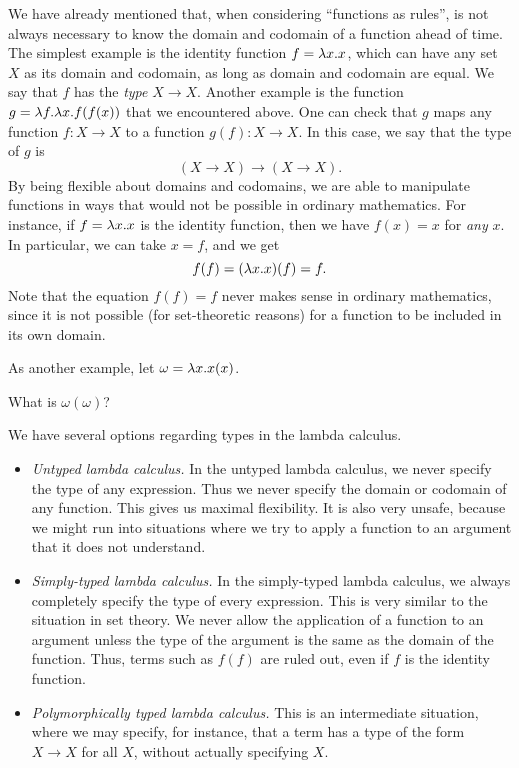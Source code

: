 \documentclass{article}
\begin{document}
We have already mentioned that, when considering ``functions as
rules'', is not always necessary to know the domain and codomain of a
function ahead of time. The simplest example is the identity function
$f = \lambda x.x$, which can have any set $X$ as its domain and codomain,
as long as domain and codomain are equal. We say that $f$ has the {\em
  type} $X\to X$.  Another example is the function $g = \lambda f.\lambda
x.f(f(x))$ that we encountered above. One can check that $g$ maps any
function $f:X\to X$ to a function $g(f):X\to X$. In this case, we say
that the type of $g$ is
\[          (X\to X)\to(X\to X).
\]
By being flexible about domains and codomains, we are able to
manipulate functions in ways that would not be possible in ordinary
mathematics. For instance, if $f=\lambda x.x$ is the identity function,
then we have $f(x) = x$ for {\em any} $x$. In particular, we can take
$x=f$, and we get
\[     f(f) = (\lambda x.x)(f) = f.
\]
Note that the equation $f(f)=f$ never makes sense in ordinary
mathematics, since it is not possible (for set-theoretic reasons) for
a function to be included in its own domain.

As another example, let $\omega = \lambda x.x(x)$. 

\begin{exercise}
  What is $\omega(\omega)$?
\end{exercise}

We have several options regarding types in the lambda calculus.
\begin{itemize}
\item {\em Untyped lambda calculus.} In the untyped lambda calculus,
  we never specify the type of any expression. Thus we never specify
  the domain or codomain of any function. This gives us maximal
  flexibility. It is also very unsafe, because we might run into
  situations where we try to apply a function to an argument that it
  does not understand. 
\item {\em Simply-typed lambda calculus.} In the simply-typed lambda
  calculus, we always completely specify the type of every expression. 
  This is very similar to the situation in set theory. We never allow
  the application of a function to an argument unless the type of the
  argument is the same as the domain of the function. Thus, terms such
  as $f(f)$ are ruled out, even if $f$ is the identity function.
\item {\em Polymorphically typed lambda calculus.} This is an
  intermediate situation, where we may specify, for instance, that a
  term has a type of the form $X\to X$ for all $X$, without actually
  specifying $X$.
\end{itemize}
\end{document}
